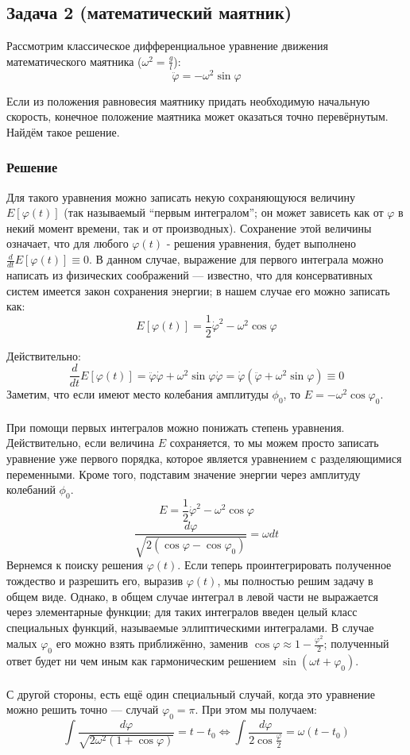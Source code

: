 \documentclass[a4paper,12pt]{article}
\begin{document}
\subsection*{Задача 2 (математический маятник)}

Рассмотрим классическое дифференциальное уравнение движения математического
маятника ($\omega^{2}=\frac{g}{l}$):
\[
\ddot{\varphi}=-\omega^{2}\sin\varphi
\]

\noindent
Если из положения равновесия маятнику придать необходимую начальную
скорость, конечное положение маятника может оказаться точно перевёрнутым.
Найдём такое решение.


\subsubsection*{Решение}

Для такого уравнения можно записать некую сохраняющуюся величину $E[\varphi(t)]$
(так называемый ``первым интегралом''; он может зависеть как от
$\varphi$ в некий момент времени, так и от производных). Сохранение
этой величины означает, что для любого $\varphi\left(t\right)$ -
решения уравнения, будет выполнено $\frac{d}{dt}E[\varphi(t)]\equiv0$.
В данном случае, выражение для первого интеграла можно написать из
физических соображений --- известно, что для консервативных систем имеется
закон сохранения энергии; в нашем случае его можно записать как:
\[
E[\varphi(t)]=\frac{1}{2}\dot{\varphi}^{2}-\omega^{2}\cos\varphi
\]

\noindent
Действительно:
\[
\frac{d}{dt}E[\varphi(t)]=\ddot{\varphi}\dot{\varphi}+\omega^{2}\sin\varphi\dot{\varphi}=\dot{\varphi}(\ddot{\varphi}+\omega^{2}\sin\varphi)\equiv0
\]
\noindent
Заметим, что если имеют место колебания амплитуды $\phi_0$, то $E=-\omega^{2}\cos\varphi_{0}$.\\\\
При помощи первых интегралов можно понижать степень уравнения. Действительно,
если величина $E$ сохраняется, то мы можем просто записать уравнение
уже первого порядка, которое является уравнением с разделяющимися переменными. Кроме того, подставим значение энергии через амплитуду колебаний $\phi_0$.
\[
E=\frac{1}{2}\dot{\varphi}^{2}-\omega^{2}\cos\varphi
\]
\[
\frac{d\varphi}{\sqrt{2(\cos\varphi-\cos\varphi_0)}}=\omega dt
\]
\noindent
Вернемся к поиску решения $\varphi(t)$. Если теперь проинтегрировать полученное тождество и разрешить его,
выразив $\varphi(t)$, мы полностью решим задачу в общем виде. Однако,
в общем случае интеграл в левой части не выражается через элементарные
функции; для таких интегралов введен целый класс специальных функций,
называемые эллиптическими интегралами. 
\noindent
В случае малых $\varphi_0$ его можно взять приближённо, заменив $\cos\varphi\approx1-\frac{\varphi^{2}}{2}$;
полученный ответ будет ни чем иным как гармоническим решением $\sin(\omega t+\varphi_{0})$.\\\\
С другой стороны, есть ещё один специальный случай, когда это уравнение 
можно решить точно --- случай $\varphi_0 = \pi$. При этом мы получаем:
\[
\int\frac{d\varphi}{\sqrt{2\omega^{2}(1+\cos\varphi)}}=t-t_{0}\Leftrightarrow\int\frac{d\varphi}{2\cos\frac{\varphi}{2}}=\omega(t-t_{0})
\]
\end{document}
